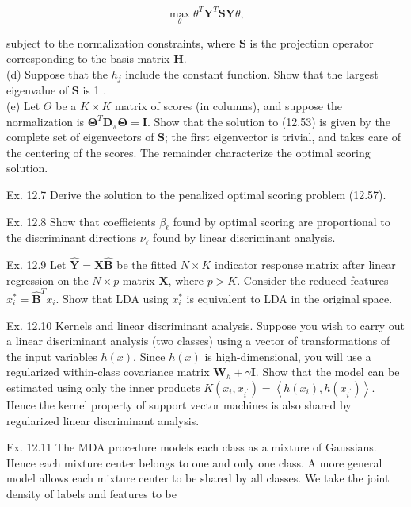 \documentclass[10pt]{article}
\begin{document}
\begin{equation*}
\max _{\theta} \theta^{T} \mathbf{Y}^{T} \mathbf{S Y} \theta, \tag{12.66}
\end{equation*}


subject to the normalization constraints, where $\mathbf{S}$ is the projection operator corresponding to the basis matrix $\mathbf{H}$.\\
(d) Suppose that the $h_{j}$ include the constant function. Show that the largest eigenvalue of $\mathbf{S}$ is 1 .\\
(e) Let $\Theta$ be a $K \times K$ matrix of scores (in columns), and suppose the normalization is $\boldsymbol{\Theta}^{T} \mathbf{D}_{\pi} \boldsymbol{\Theta}=\mathbf{I}$. Show that the solution to (12.53) is given by the complete set of eigenvectors of $\mathbf{S}$; the first eigenvector is trivial, and takes care of the centering of the scores. The remainder characterize the optimal scoring solution.

Ex. 12.7 Derive the solution to the penalized optimal scoring problem (12.57).

Ex. 12.8 Show that coefficients $\beta_{\ell}$ found by optimal scoring are proportional to the discriminant directions $\nu_{\ell}$ found by linear discriminant analysis.

Ex. 12.9 Let $\hat{\mathbf{Y}}=\mathbf{X} \hat{\mathbf{B}}$ be the fitted $N \times K$ indicator response matrix after linear regression on the $N \times p$ matrix $\mathbf{X}$, where $p>K$. Consider the reduced features $x_{i}^{*}=\hat{\mathbf{B}}^{T} x_{i}$. Show that LDA using $x_{i}^{*}$ is equivalent to LDA in the original space.

Ex. 12.10 Kernels and linear discriminant analysis. Suppose you wish to carry out a linear discriminant analysis (two classes) using a vector of transformations of the input variables $h(x)$. Since $h(x)$ is high-dimensional, you will use a regularized within-class covariance matrix $\mathbf{W}_{h}+\gamma \mathbf{I}$. Show that the model can be estimated using only the inner products $K\left(x_{i}, x_{i^{\prime}}\right)= \left\langle h\left(x_{i}\right), h\left(x_{i^{\prime}}\right)\right\rangle$. Hence the kernel property of support vector machines is also shared by regularized linear discriminant analysis.

Ex. 12.11 The MDA procedure models each class as a mixture of Gaussians. Hence each mixture center belongs to one and only one class. A more general model allows each mixture center to be shared by all classes. We take the joint density of labels and features to be
\end{document}
